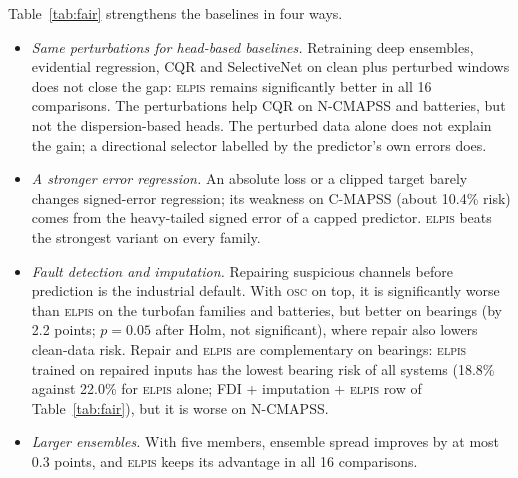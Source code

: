 \documentclass{esannV2}
\newcommand{\OSC}{\textsc{osc}}
\newcommand{\RPT}{\textsc{elpis}}
\begin{document}
Table~\ref{tab:fair} strengthens the baselines in four ways.
\begin{itemize}
\item \emph{Same perturbations for head-based baselines.} Retraining deep ensembles, evidential regression, CQR and SelectiveNet on clean plus perturbed windows does not close the gap: \RPT{} remains significantly better in all 16 comparisons. The perturbations help CQR on N-CMAPSS and batteries, but not the dispersion-based heads. The perturbed data alone does not explain the gain; a directional selector labelled by the predictor's own errors does.
\item \emph{A stronger error regression.} An absolute loss or a clipped target barely changes signed-error regression; its weakness on C-MAPSS (about 10.4\% risk) comes from the heavy-tailed signed error of a capped predictor. \RPT{} beats the strongest variant on every family.
\item \emph{Fault detection and imputation.} Repairing suspicious channels before prediction is the industrial default. With \OSC{} on top, it is significantly worse than \RPT{} on the turbofan families and batteries, but better on bearings (by 2.2 points; $p=0.05$ after Holm, not significant), where repair also lowers clean-data risk. Repair and \RPT{} are complementary on bearings: \RPT{} trained on repaired inputs has the lowest bearing risk of all systems (18.8\% against 22.0\% for \RPT{} alone; FDI + imputation + \RPT{} row of Table~\ref{tab:fair}), but it is worse on N-CMAPSS.
\item \emph{Larger ensembles.} With five members, ensemble spread improves by at most 0.3 points, and \RPT{} keeps its advantage in all 16 comparisons.
\end{itemize}


\FloatBarrier
\end{document}
